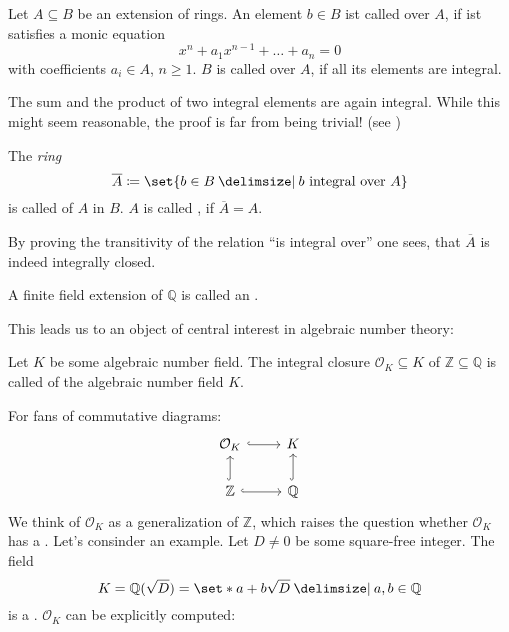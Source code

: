 \begin{definition}[{name=[Integral Elements]{\cite[Def.~2.1]{neukirch}}}]
	Let $A \subseteq B$ be an extension of rings.
	An element $b \in B$ ist called  over $A$, if ist satisfies a monic equation
	\[
		x^n + a_1 x^{n-1} + \ldots + a_n =0
	\]
	with coefficients $a_i \in A$, $n\ge 1$.
	$B$ is called  over $A$, if all its elements are integral.
\end{definition}

\begin{remark}
	The sum and the product of two integral elements are again integral.
	While this might seem reasonable, the proof is far from being trivial! (see \textcite[Prop.~2.2]{neukirch})
\end{remark}

\begin{definition}[{name=[integral closure]}]
	The \emph{ring}
	\[
		\overline{A} \coloneqq \set{b \in B \given b \text{ integral over }A}
	\]
	is called  of $A$ in $B$.
	$A$ is called , if $\overline{A} = A$.
\end{definition}

By proving the transitivity of the relation \enquote{is integral over} one sees, that $\overline{A}$ is indeed integrally closed.

\begin{definition}[{name=[algebraic number field]}]
	A finite field extension of $\mathbb{Q}$ is called an .
\end{definition}

This leads us to an object of central interest in algebraic number theory:

\begin{definition}[{name=[ring of integers]}]
	Let $K$ be some algebraic number field.
	The integral closure $\mathcal{O}_K \subseteq K$ of $\mathbb{Z} \subseteq \mathbb{Q}$ is called  of the algebraic number field $K$.
\end{definition}

For fans of commutative diagrams:
\[
	\begin{tikzcd}
		\mathcal{O}_K \rar[hook] & K \\
		\mathbb{Z} \uar[hook] \rar[hook] & \mathbb{Q} \uar[hook]
	\end{tikzcd}
\]
We think of $\mathcal{O}_K$ as a generalization of $\mathbb{Z}$, which raises the question whether $\mathcal{O}_K$ has a . Let's consinder an example.
Let $D\neq 0$ be some square-free integer.
The field
\[
	K=\mathbb{Q}(\sqrt{D}) = \set*{a + b \sqrt{D} \given a,b \in \mathbb{Q}}
\]
is a . $\mathcal{O}_K$ can be explicitly computed:

